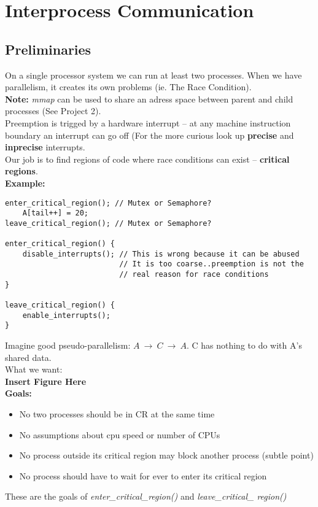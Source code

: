 \documentclass[../base_file/cs1550_notes.tex]{subfiles}
\begin{document}
\chapter{Interprocess Communication}
\section{Preliminaries}
On a single processor system we can run at least two processes.  When we
have parallelism, it creates its own problems (ie. The Race Condition).\\

\textbf{Note:} \textit{mmap} can be used to share an adress space between
parent and child processes (See Project 2).\\

Preemption is trigged by a hardware interrupt -- at any machine instruction
boundary an interrupt can go off (For the more curious look up
\textbf{precise} and \textbf{inprecise} interrupts.\\

Our job is to find regions of code where race conditions can exist --
\textbf{critical regions}.\\

\textbf{Example:}\\
\begin{lstlisting}
enter_critical_region(); // Mutex or Semaphore?
	A[tail++] = 20;			
leave_critical_region(); // Mutex or Semaphore? 

enter_critical_region() {
	disable_interrupts(); // This is wrong because it can be abused
						  // It is too coarse..preemption is not the
						  // real reason for race conditions
}

leave_critical_region() {
	enable_interrupts();
}
\end{lstlisting}

Imagine good pseudo-parallelism: $A\ \rightarrow\ C\ \rightarrow\ A$.
C has nothing to do with A's shared data.\\

What we want:\\
\textbf{Insert Figure Here}\\
\textbf{Goals:}
\begin{itemize}
	\item No two processes should be in CR at the same time
	\item No assumptions about cpu speed or number of CPUs
	\item No process outside its critical region may block another
			process (subtle point)
	\item No process should have to wait for ever to enter its
			critical region
\end{itemize}
These are the goals of \textit{enter\_critical\_region()} and \textit{leave\_critical\_
region()}
\end{document}
